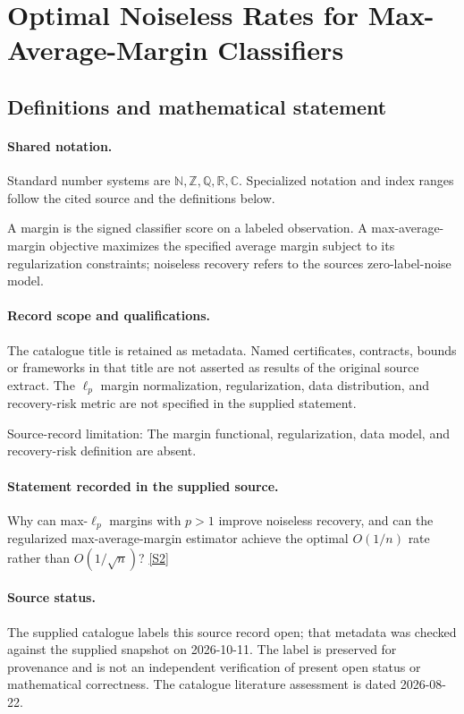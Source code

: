 \documentclass[11pt]{article}
\newcommand{\sref}[2]{\hyperlink{source:#1:#2}{[S#2]}}
\begin{document}
\section{Optimal Noiseless Rates for Max-Average-Margin Classifiers}\label{statement}

\subsection{Definitions and mathematical statement}

\paragraph{Shared notation.}Standard number systems are $\mathbb N,\mathbb Z,\mathbb Q,\mathbb R,\mathbb C$. Specialized notation and index ranges follow the cited source and the definitions below.


A margin is the signed classifier score on a labeled observation. A max-average-margin objective maximizes the specified average margin subject to its regularization constraints; noiseless recovery refers to the source\textquotesingle s zero-label-noise model.
\paragraph{Record scope and qualifications.}
The catalogue title is retained as metadata. Named certificates, contracts, bounds or frameworks in that title are not asserted as results of the original source extract.
The $\ell_p$ margin normalization, regularization, data distribution, and recovery-risk metric are not specified in the supplied statement.

Source-record limitation: The margin functional, regularization, data model, and recovery-risk definition are absent.
\paragraph{Statement recorded in the supplied source.}
Why can max-$\ell_p$ margins with $p>1$ improve noiseless recovery, and can the regularized max-average-margin estimator achieve the optimal $O(1/n)$ rate rather than $O(1/\sqrt n)$? \sref{statement}{2}
\paragraph{Source status.}
The supplied catalogue labels this source record open; that metadata was checked against the supplied snapshot on 2026-10-11. The label is preserved for provenance and is not an independent verification of present open status or mathematical correctness. The catalogue literature assessment is dated 2026-08-22.
\end{document}

